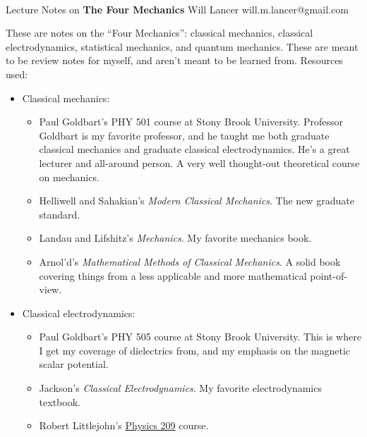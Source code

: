 \documentclass[11pt]{article}
\begin{document}
\thispagestyle{empty}
\bigskip \
\vspace{0.1cm}

\begin{center}
{\fontsize{22}{22} \selectfont Lecture Notes on}
\vskip 16pt
{\fontsize{36}{36} \selectfont \bf \sffamily The Four Mechanics}
\vskip 24pt
{\fontsize{18}{18} \selectfont \rmfamily Will Lancer} 
\vskip 6pt
{\fontsize{14}{14} \selectfont \ttfamily will.m.lancer@gmail.com} 
\vskip 24pt
\end{center}

{\parindent0pt \baselineskip=15.5pt}
\noin
These are notes on the ``Four Mechanics'': classical
mechanics, classical electrodynamics, statistical mechanics, and
quantum mechanics. These are meant to be review notes
for myself, and aren't meant to be learned from.
Resources used:
\begin{itemize}
    \item Classical mechanics:
    \begin{itemize}
        \item Paul Goldbart's PHY 501 course at Stony Brook University.
        Professor Goldbart is my favorite professor, and he taught me
        both graduate classical mechanics and graduate classical electrodynamics.
        He's a great lecturer and all-around person. A very well thought-out
        theoretical course on mechanics.
        \item Helliwell and Sahakian's \emph{Modern Classical Mechanics}.
        The new graduate standard.
        \item Landau and Lifshitz's \emph{Mechanics}. My favorite mechanics book.
        \item Arnol'd's \emph{Mathematical Methods of Classical Mechanics}.
        A solid book covering things from a less applicable and more mathematical
        point-of-view.
    \end{itemize}
    \item Classical electrodynamics:
    \begin{itemize}
        \item Paul Goldbart's PHY 505 course at Stony Brook University.
        This is where I get my coverage of dielectrics from, and my emphasis
        on the magnetic scalar potential.
        \item Jackson's \emph{Classical Electrodynamics}. My favorite electrodynamics
        textbook.
        \item Robert Littlejohn's \href{https://bohr.physics.berkeley.edu/classes/209/f02/209.html}{Physics 209} course. 

\end{itemize}
\end{itemize}
\end{document}
